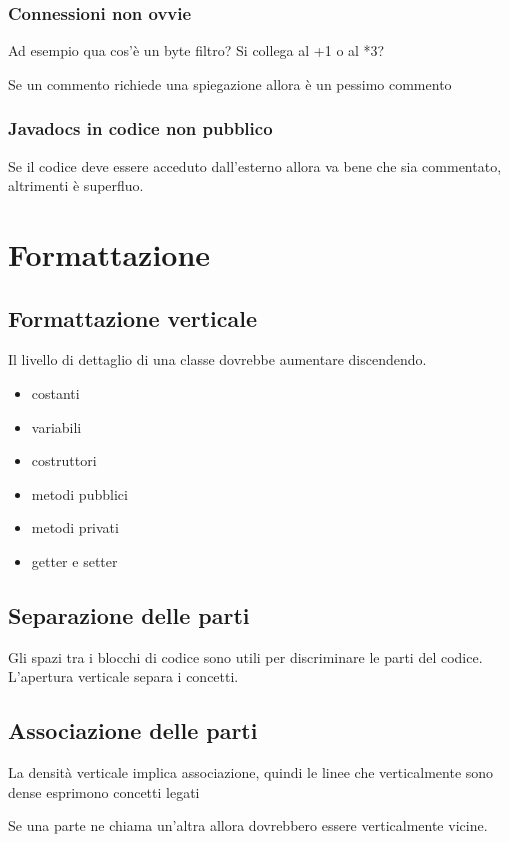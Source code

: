 \documentclass[11pt,a4paper]{book}
\begin{document}
\subsection{Connessioni non ovvie}
\label{code: 037}
Ad esempio qua cos'è un byte filtro? Si collega al +1 o al *3?

Se un commento richiede una spiegazione allora è un pessimo commento

\subsection{Javadocs in codice non pubblico}
Se il codice deve essere acceduto dall'esterno allora va bene che sia commentato, altrimenti è superfluo.

\chapter{Formattazione}
\section{Formattazione verticale}
Il livello di dettaglio di una classe dovrebbe aumentare discendendo.
\begin{itemize}
	\item costanti
	\item variabili
	\item costruttori
	\item metodi pubblici
	\item metodi privati
	\item getter e setter
\end{itemize}

\section{Separazione delle parti}
Gli spazi tra i blocchi di codice sono utili per discriminare le parti del codice. L'apertura verticale separa i concetti.

\section{Associazione delle parti}
La densità verticale implica associazione, quindi le linee che verticalmente sono dense esprimono concetti legati

Se una parte ne chiama un'altra allora dovrebbero essere verticalmente vicine.
\end{document}
